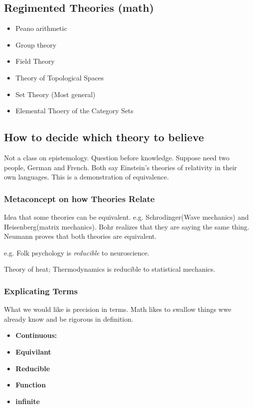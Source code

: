 \documentclass[11pt]{article}
\begin{document}
\subsection{Regimented Theories (math)}
\label{sec:org0bacb72}

\begin{itemize}
\item Peano arithmetic
\item Group theory
\item Field Theory
\item Theory of Topological Spaces
\item Set Theory (Most general)
\item Elemental Thoery of the Category Sets
\end{itemize}

\subsection{How to decide which theory to believe}
\label{sec:org4076328}

Not a class on epistemology. Question before knowledge.
Suppose need two people, German and French. Both say Einstein's theories of relativity in their own
languages. This is a demonstration of equivalence.

\subsubsection{Metaconcept on how Theories Relate}
\label{sec:org12cc6f6}
Idea that some theories can be equivalent. 
e.g. Schrodinger(Wave mechanics) and Heisenberg(matrix mechanics). Bohr realizes that they are saying the 
same thing. Neumann proves that both theories are equivalent.

e.g. Folk psychology is \emph{reducible} to neuroscience.

Theory of heat; Thermodynamics is reducible to statistical mechanics.

\subsubsection{Explicating Terms}
\label{sec:org055f8be}
What we would like is precision in terms. Math likes to swallow things wwe already know
and be rigorous in definition. 

\begin{itemize}
\item \textbf{Continuous:}
\item \textbf{Equivilant}
\item \textbf{Reducible}
\item \textbf{Function}
\item \textbf{infinite}
\end{itemize}
\end{document}
